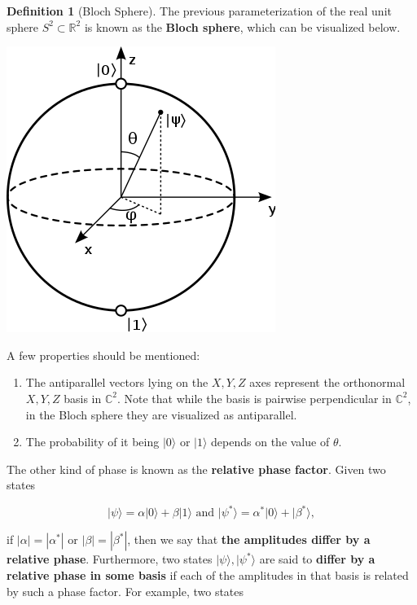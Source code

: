\documentclass{article}
\theoremstyle{definition}
\newtheorem{definition}{Definition}[section]
\begin{document}
    \begin{definition}[Bloch Sphere]
      The previous parameterization of the real unit sphere $S^2 \subset \mathbb{R}^2$ is known as the \textbf{Bloch sphere}, which can be visualized below. 

      \begin{center}
        \includegraphics[scale=0.4]{img/330px-Bloch_sphere.png}
      \end{center}


      A few properties should be mentioned: 
      \begin{enumerate}
        \item The antiparallel vectors lying on the $X, Y, Z$ axes represent the orthonormal $X, Y, Z$ basis in $\mathbb{C}^2$. Note that while the basis is pairwise perpendicular in $\mathbb{C}^2$, in the Bloch sphere they are visualized as antiparallel. 

        \item The probability of it being $|0\rangle$ or $|1\rangle$ depends on the value of $\theta$. 
      \end{enumerate}
    \end{definition}

    



    The other kind of phase is known as the \textbf{relative phase factor}. Given two states

      \[|\psi \rangle = \alpha |0\rangle + \beta |1\rangle \text{ and } |\psi^* \rangle = \alpha^* |0 \rangle + | \beta^* \rangle,\]

    if $|\alpha| = |\alpha^*|$ or $|\beta| = |\beta^*|$, then we say that \textbf{the amplitudes differ by a relative phase}. Furthermore, two states $|\psi \rangle, |\psi^* \rangle$ are said to \textbf{differ by a relative phase in some basis} if each of the amplitudes in that basis is related by such a phase factor. For example, two states 
\end{document}
